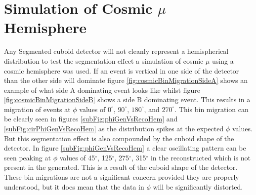 \section{Simulation of Cosmic $\mu$ Hemisphere}\label{sec:SimulationOfCosmics}
Any Segmented cuboid detector will not cleanly represent a hemispherical distribution to test the segmentation effect a simulation of cosmic $\mu$ using a cosmic hemisphere was used. If an event is vertical in one side of the detector than the other side will dominate figure  \ref{fig:cosmicBinMigrationSideA} shows an example of what side A dominating event looks like whilst figure \ref{fig:cosmicBinMigrationSideB} shows a side B dominating event. This results in a migration of events at $\phi$ values of $0^\circ$, $90^\circ$, $180^\circ$, and $270^\circ$. This bin migration can be clearly seen in figures \ref{subFig:phiGenVsRecoHem} and \ref{subFig:cirPhiGenVsRecoHem} as the distribution spikes at the expected $\phi$ values. But this segmentation effect is also compounded by the cuboid shape of the detector. In figure \ref{subFig:phiGenVsRecoHem} a clear oscillating pattern can be seen peaking at $\phi$ values of 45$^\circ$, 125$^\circ$, 275$^\circ$, 315$^\circ$ in the reconstructed which is not present in the generated. This is a result of the cuboid shape of the detector. These bin migrations are not a significant concern provided they are properly understood, but it does mean that the data in $\phi$ will be significantly distorted.  
 
